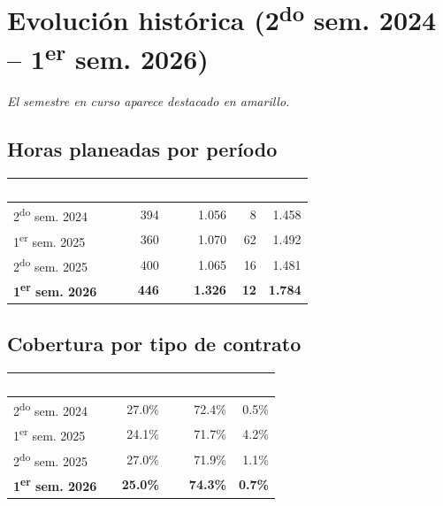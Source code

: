 \documentclass[11pt, a4paper]{article}
\begin{document}
\section{Evolución histórica (2\textsuperscript{do} sem. 2024 -- 1\textsuperscript{er} sem. 2026)}

\textit{El semestre en curso aparece destacado en amarillo.}

\subsection{Horas planeadas por período}

\begin{tabular}{lrrrr}
\toprule
\rowcolor{usachDark} \textbf{\textcolor{white}{Periodo}} & \textbf{\textcolor{white}{Jornada}} & \textbf{\textcolor{white}{Por hora}} & \textbf{\textcolor{white}{SP}} & \textbf{\textcolor{white}{Total}} \\
\midrule
2\textsuperscript{do} sem. 2024 & 394 & 1.056 & 8 & 1.458 \\
\rowcolor{rowEven}1\textsuperscript{er} sem. 2025 & 360 & 1.070 & 62 & 1.492 \\
2\textsuperscript{do} sem. 2025 & 400 & 1.065 & 16 & 1.481 \\
\rowcolor{rowHighlight}\textbf{1\textsuperscript{er} sem. 2026} & \textbf{446} & \textbf{1.326} & \textbf{12} & \textbf{1.784} \\
\bottomrule
\end{tabular}

\subsection{Cobertura por tipo de contrato}

\begin{tabular}{lrrr}
\toprule
\rowcolor{usachDark} \textbf{\textcolor{white}{Periodo}} & \textbf{\textcolor{white}{Jornada}} & \textbf{\textcolor{white}{Por hora}} & \textbf{\textcolor{white}{SP}} \\
\midrule
2\textsuperscript{do} sem. 2024 & 27.0\% & 72.4\% & 0.5\% \\
\rowcolor{rowEven}1\textsuperscript{er} sem. 2025 & 24.1\% & 71.7\% & 4.2\% \\
2\textsuperscript{do} sem. 2025 & 27.0\% & 71.9\% & 1.1\% \\
\rowcolor{rowHighlight}\textbf{1\textsuperscript{er} sem. 2026} & \textbf{25.0\%} & \textbf{74.3\%} & \textbf{0.7\%} \\
\bottomrule
\end{tabular}
\end{document}
